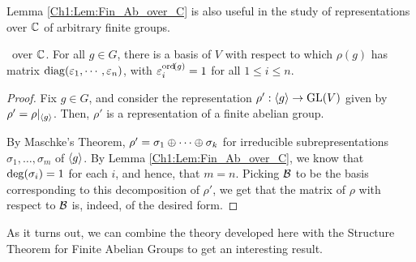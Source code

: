 Lemma \ref{Ch1:Lem:Fin_Ab_over_C} is also useful in the study of representations over $\mathbb{C}$ of arbitrary finite groups.

\begin{proposition}
    \ over $\mathbb{C}$. For all $g \in G$, there is a basis of $V$ with respect to which $\rho(g)$ has matrix $\operatorname{diag}\!\left( \varepsilon_1, \cdots, \varepsilon_n \right)$, with $\varepsilon_i^{\operatorname{ord}\!\left( g \right)} = 1$ for all $1 \leq i \leq n$.
\end{proposition}
\begin{proof}
    Fix $g \in G$, and consider the representation $\rho' : \left\langle g \right\rangle \to \operatorname{GL}\!\left( V \right)$ given by $\rho' = \rho\vert_{\left\langle g \right\rangle}$. Then, $\rho'$ is a representation of a finite abelian group.

    By Maschke's Theorem, $\rho' = \sigma_1 \oplus \cdots \oplus \sigma_k$ for irreducible subrepresentations $\sigma_1, \ldots, \sigma_m$ of $\left\langle g \right\rangle$. By Lemma \ref{Ch1:Lem:Fin_Ab_over_C}, we know that $\deg\!\left( \sigma_i \right) = 1$ for each $i$, and hence, that $m = n$. Picking $\mathcal{B}$ to be the basis corresponding to this decomposition of $\rho'$, we get that the matrix of $\rho$ with respect to $\mathcal{B}$ is, indeed, of the desired form.
\end{proof}

As it turns out, we can combine the theory developed here with the Structure Theorem for Finite Abelian Groups to get an interesting result.

